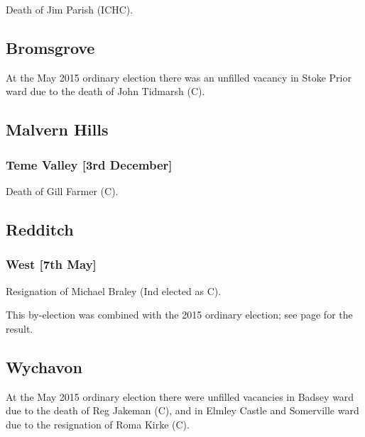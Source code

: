 \documentclass[a4paper,openany]{book}
\begin{document}
\begin{resultsiii}

Death of Jim Parish (ICHC).

\subsection*{Bromsgrove}

At the May 2015 ordinary election there was an unfilled vacancy in Stoke Prior ward due to the death of John Tidmarsh (C).

\subsection*{Malvern Hills}

\subsubsection*{Teme Valley \hspace*{\fill}\nolinebreak[1]%
\enspace\hspace*{\fill}
[3rd December]}


Death of Gill Farmer (C).

\subsection*{Redditch}

\subsubsection*{West \hspace*{\fill}\nolinebreak[1]%
\enspace\hspace*{\fill}
[7th May]}


Resignation of Michael Braley (Ind elected as C).

This by-election was combined with the 2015 ordinary election; see page \pageref{WestRedditch} for the result.

\subsection*{Wychavon}

At the May 2015 ordinary election there were unfilled vacancies in Badsey ward due to the death of Reg Jakeman (C), and in Elmley Castle and Somerville ward due to the resignation of Roma Kirke (C).


\end{resultsiii}
\end{document}
